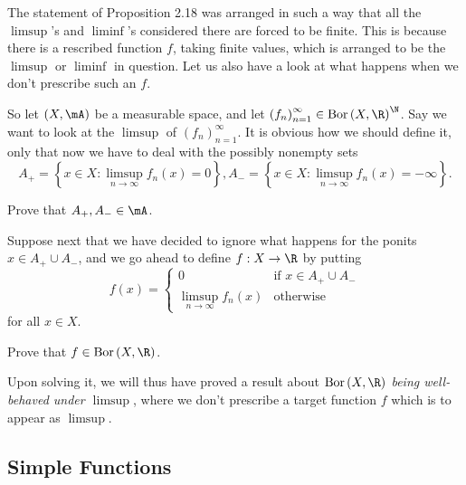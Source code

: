 \documentclass[pmath450]{subfiles}
\begin{document}
    \np The statement of Proposition 2.18 was arranged in such a way that all the $\limsup$'s and $\liminf$'s considered there are forced to be finite. This is because there is a rescribed function $f$, taking finite values, which is arranged to be the $\limsup$ or $\liminf$ in question. Let us also have a look at what happens when we don't prescribe such an $f$.

    So let $\left( X,\mA \right)$ be a measurable space, and let $\left( f_{n} \right)^{\infty}_{n=1}\in\bor\left( X,\R \right)^{\N}$. Say we want to look at the $\limsup$ of $\left( f_{n} \right)^{\infty}_{n=1}$. It is obvious how we should define it, only that now we have to deal with the possibly nonempty sets
    \begin{equation*}
        A_+ = \left\lbrace x\in X: \limsup_{n\to\infty}f_n\left( x \right)=0 \right\rbrace, A_- = \left\lbrace x\in X:\limsup_{n\to\infty}f_n\left( x \right)=-\infty \right\rbrace.
    \end{equation*}

    \begin{exercise}{}
        Prove that $A_+,A_-\in\mA$.
    \end{exercise}

    \placeqed[tl;dr]

    \np Suppose next that we have decided to ignore what happens for the ponits $x\in A_+\cup A_-$, and we go ahead to define $f:X\to\R$ by putting
    \begin{equation*}
        f\left( x \right) = 
        \begin{cases} 0 & \text{if $x\in A_+\cup A_-$} \\ \limsup_{n\to\infty}f_n\left( x \right) & \text{otherwise} \end{cases}
    \end{equation*}
    for all $x\in X$.

    \begin{exercise}{}
        Prove that $f\in\bor\left( X,\R \right)$.
    \end{exercise}

    \placeqed[tl;dr]

    \np Upon solving it, we will thus have proved a result about \textit{$\bor\left( X,\R \right)$ being well-behaved under $\limsup$}, where we don't prescribe a target function $f$ which is to appear as $\limsup$.

    \clearpage
    \subsection{Simple Functions}
\end{document}
